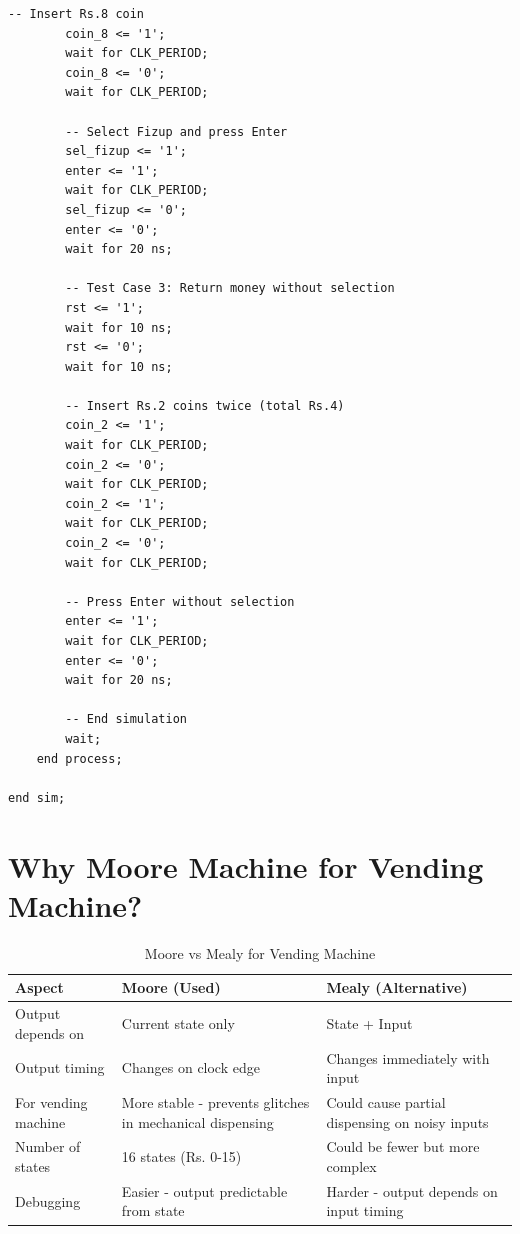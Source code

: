 \documentclass[12pt,a4paper]{article}
\begin{document}
\begin{lstlisting}[caption={vending\_machine\_tb.vhd}]
        -- Insert Rs.8 coin
        coin_8 <= '1';
        wait for CLK_PERIOD;
        coin_8 <= '0';
        wait for CLK_PERIOD;
        
        -- Select Fizup and press Enter
        sel_fizup <= '1';
        enter <= '1';
        wait for CLK_PERIOD;
        sel_fizup <= '0';
        enter <= '0';
        wait for 20 ns;
        
        -- Test Case 3: Return money without selection
        rst <= '1';
        wait for 10 ns;
        rst <= '0';
        wait for 10 ns;
        
        -- Insert Rs.2 coins twice (total Rs.4)
        coin_2 <= '1';
        wait for CLK_PERIOD;
        coin_2 <= '0';
        wait for CLK_PERIOD;
        coin_2 <= '1';
        wait for CLK_PERIOD;
        coin_2 <= '0';
        wait for CLK_PERIOD;
        
        -- Press Enter without selection
        enter <= '1';
        wait for CLK_PERIOD;
        enter <= '0';
        wait for 20 ns;
        
        -- End simulation
        wait;
    end process;

end sim;
\end{lstlisting}

\newpage
\section{Why Moore Machine for Vending Machine?}

\begin{table}[H]
    \centering
    \begin{tabular}{|p{3cm}|p{5cm}|p{5cm}|}
        \hline
        \textbf{Aspect} & \textbf{Moore (Used)} & \textbf{Mealy (Alternative)} \\
        \hline
        Output depends on & Current state only & State + Input \\
        \hline
        Output timing & Changes on clock edge & Changes immediately with input \\
        \hline
        For vending machine & More stable - prevents glitches in mechanical dispensing & Could cause partial dispensing on noisy inputs \\
        \hline
        Number of states & 16 states (Rs. 0-15) & Could be fewer but more complex \\
        \hline
        Debugging & Easier - output predictable from state & Harder - output depends on input timing \\
        \hline
    \end{tabular}
    \caption{Moore vs Mealy for Vending Machine}
\end{table}
\end{document}
